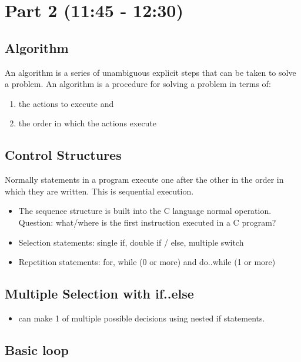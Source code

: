 \documentclass[11pt]{article}
\begin{document}
\section*{Part 2 (11:45 - 12:30)}
\label{sec-2}
\subsection*{Algorithm}
\label{sec-2-1}

An algorithm is a series of unambiguous explicit steps that can be taken to solve a problem.
An algorithm is a procedure for solving a problem in terms of:

\begin{enumerate}
\item the actions to execute and
\item the order in which the actions execute
\end{enumerate}
\subsection*{Control Structures}
\label{sec-2-2}

Normally statements in a program execute one after the other in the
order in which they are written.  This is sequential execution.

\begin{itemize}
\item The sequence structure is built into the C language normal operation.
  Question: what/where is the first instruction executed in a C program?
\item Selection statements: single if, double if / else, multiple switch
\item Repetition statements: for, while (0 or more) and do..while (1 or more)
\end{itemize}
\subsection*{Multiple Selection with if..else}
\label{sec-2-3}

\begin{itemize}
\item can make 1 of multiple possible decisions using nested if statements.
\end{itemize}
\subsection*{Basic loop}
\label{sec-2-4}
\end{document}
